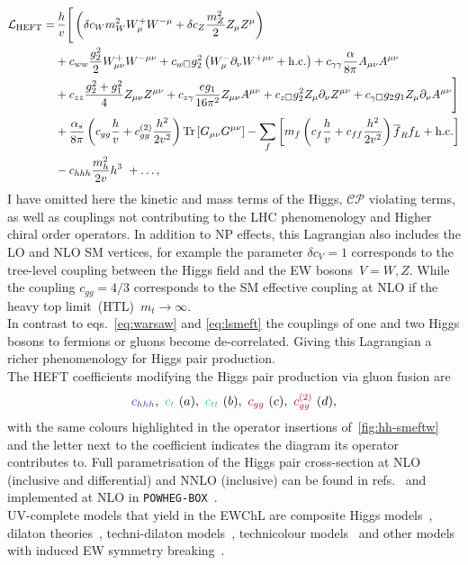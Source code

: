 \begin{align}\nonumber
	\mathcal{L}_{\mathrm{HEFT}} = & \, \frac{h}{v} \Bigg[  \left( \delta c_W m_W^2 W_{\mu}^+W^{-\mu} +\delta c_Z \frac{m_Z^2}{2} Z_\mu Z^\mu\right)  \\\nonumber
	&+c_{ww}\frac{g_2^2}{2}W_{\mu\nu}^+W^{-\mu\nu} + c_{w\square} g_2^2\left(W_{\mu}^-\partial_\nu W^{+\mu\nu} + \text{h.c.}\right) +  c_{\gamma\gamma}\frac{\alpha}{8 \pi}A_{\mu\nu}A^{\mu\nu} \\\nonumber
	& +c_{zz}\frac{g_2^2 + g_1^2}{4} Z_{\mu\nu}Z^{\mu\nu}+ c_{z\gamma}\frac{e g_1}{16 \pi^2}Z_{\mu\nu}A^{\mu\nu}
	+c_{z\square}g_2^2Z_\mu\partial_\nu Z^{\mu\nu}
	+c_{\gamma \square}g_2 g_1 Z_\mu\partial_\nu A^{\mu\nu}
	\Bigg]\\\nonumber
	&+ \frac{\alpha_s}{8 \pi} \left( c_{gg} \frac{h}{v} +  c_{gg}^{(2)} \frac{h^2}{2 v^2}\right) \mbox{Tr}\,[G_{\mu\nu} G^{\mu\nu}]
	-\sum_f \left[ m_f \left(c_f \frac{h}{v} + c _{ff} \frac{h^2}{2v^2}\right) \overline{f}_{R}f_{L}+\text{h.c.}\right]\\
	& - c_{hhh} \frac{m_h^2}{2 v} h^3\ + \dots,\label{eq:coupl_def}
\end{align}
I have omitted here the kinetic and mass terms of the Higgs, $\mathcal{CP}$ violating terms, as well as couplings not contributing to the LHC phenomenology and Higher chiral order operators. 
In addition to NP effects, this Lagrangian also includes the LO and NLO SM vertices, for example the parameter $\delta c_V=1$ corresponds to the tree-level coupling between the Higgs field and the EW bosons~$ V=W, Z$. While the coupling $c_{gg}= 4/3$ corresponds to the SM effective coupling at NLO if the heavy top limit~(HTL)~$m_t \to \infty$. \\
In contrast to eqs.~\eqref{eq:warsaw} and \eqref{eq:lsmeft} the couplings of one and two Higgs bosons to fermions or gluons become de-correlated. Giving this Lagrangian a richer phenomenology for Higgs pair production.  \\
The HEFT coefficients modifying the Higgs pair production via gluon fusion are 
\begin{equation}
\textcolor[HTML]{4334a0}{c_{hhh} }, \ 	\textcolor[HTML]{2ebbaa}{c_t}\ (a) , \  	\textcolor[HTML]{2ebbaa}{c_{tt}} \ (b), \  \textcolor[HTML]{ae0034}{c_{gg}} \ (c), \  \textcolor[HTML]{ae0034}{c_{gg}^{(2)}} \ (d),
\end{equation}
with the same colours highlighted in the operator insertions of~\autoref{fig:hh-smeftw} and the letter next to the coefficient indicates the diagram its operator contributes to.  Full parametrisation of the Higgs pair cross-section at NLO (inclusive and differential) and NNLO (inclusive)  can be found in refs.~\cite{Buchalla:2018yce,Capozi:2019xsi,deFlorian:2021azd} and implemented at NLO in \texttt{POWHEG-BOX}~\cite{Heinrich:2020ckp}. \\ UV-complete models that yield in the EWChL are composite Higgs models~\cite{Contino:2010rs,Panico:2015jxa,AGASHE2005165}, dilaton  theories~\cite{PhysRevLett.100.111802}, techni-dilaton models~\cite{Habaa:2010rbs}, technicolour models~\cite{Delgado:2010bb} and other models with induced EW symmetry breaking~\cite{Galloway:2013dma,Chang:2014ida}.
